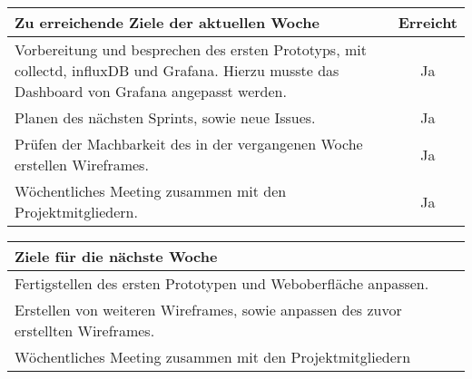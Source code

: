 \begin{tabularx}{\textwidth}{Xc}
    \arrayrulecolor{OliveGreen}
    \toprule
    {\bfseries Zu erreichende Ziele der aktuellen Woche} & {\bfseries Erreicht} \\
    \midrule[2pt]
    Vorbereitung und besprechen des ersten Prototyps, mit collectd, influxDB
    und Grafana. Hierzu musste das Dashboard von Grafana angepasst werden.&Ja\\
    \rowcolor{OliveGreen!15}
    Planen des nächsten Sprints, sowie neue Issues.                     &Ja   \\
    \rowcolor{White}
    Prüfen der Machbarkeit des in der vergangenen Woche erstellen Wireframes. &Ja   \\
    \rowcolor{OliveGreen!15}
    Wöchentliches Meeting zusammen mit den Projektmitgliedern.          &Ja   \\
   \bottomrule[2pt]
\end{tabularx}
%
\vspace{1cm}
%
\begin{tabularx}{\textwidth}{Xc}
    \arrayrulecolor{OliveGreen}
    \toprule
    {\bfseries Ziele für die nächste Woche}          &                      \\
    \midrule[2pt]
    Fertigstellen des ersten Prototypen und Weboberfläche anpassen.    &     \\
    \rowcolor{OliveGreen!15}
    Erstellen von weiteren Wireframes, sowie anpassen des zuvor erstellten
    Wireframes.                         &                      \\
    \rowcolor{White}
    Wöchentliches Meeting zusammen mit den Projektmitgliedern & \\
\end{tabularx}
